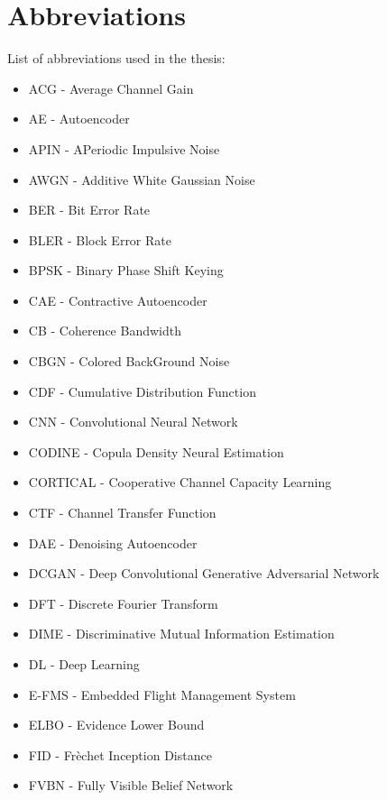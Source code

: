 \section*{Abbreviations}
\label{sec:abbreviations}
List of abbreviations used in the thesis:

\begin{multicols}{2}

	\fontsize{7}{7}\selectfont
	\begin{itemize}
		\setlength\itemsep{0em}
  		\item ACG - Average Channel Gain
		\item AE - Autoencoder
		\item APIN - APeriodic Impulsive Noise
            \item AWGN - Additive White Gaussian Noise
		\item BER - Bit Error Rate
            \item BLER - Block Error Rate
		\item BPSK - Binary Phase Shift Keying
            \item CAE - Contractive Autoencoder
            \item CB - Coherence Bandwidth
            \item CBGN - Colored BackGround Noise
		\item CDF - Cumulative Distribution Function
            \item CNN - Convolutional Neural Network
            \item CODINE - Copula Density Neural Estimation
            \item CORTICAL - Cooperative Channel Capacity Learning
		\item CTF - Channel Transfer Function
            \item DAE - Denoising Autoencoder
            \item DCGAN - Deep Convolutional Generative Adversarial Network
		\item DFT - Discrete Fourier Transform
            \item DIME - Discriminative Mutual Information Estimation
            \item DL - Deep Learning
            \item E-FMS - Embedded Flight Management System
            \item ELBO - Evidence Lower Bound
            \item FID - Frèchet Inception Distance
            \item FVBN - Fully Visible Belief Network

\end{itemize}
\end{multicols}

